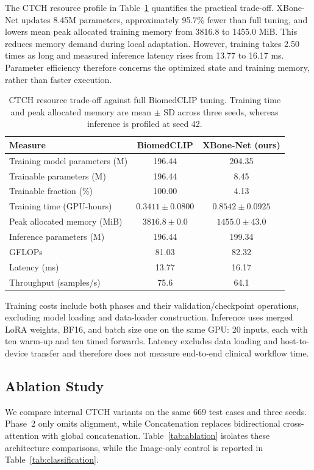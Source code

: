 \documentclass[conference,a4paper]{IEEEtran}
\begin{document}
The CTCH resource profile in Table~\ref{tab:cost} quantifies the practical trade-off. XBone-Net updates 8.45M parameters, approximately 95.7\% fewer than full tuning, and lowers mean peak allocated training memory from 3816.8 to 1455.0 MiB. This reduces memory demand during local adaptation. However, training takes 2.50 times as long and measured inference latency rises from 13.77 to 16.17 ms. Parameter efficiency therefore concerns the optimized state and training memory, rather than faster execution.

\begin{table}[t]
\caption{CTCH resource trade-off against full BiomedCLIP tuning. Training time and peak allocated memory are mean $\pm$ SD across three seeds, whereas inference is profiled at seed 42.}
\label{tab:cost}
\centering\footnotesize
\begin{tabular}{@{}lcc@{}}
\toprule
Measure & BiomedCLIP & \textbf{XBone-Net (ours)} \\
\midrule
Training model parameters (M) & 196.44 & 204.35 \\
Trainable parameters (M) & 196.44 & 8.45 \\
Trainable fraction (\%) & 100.00 & 4.13 \\
Training time (GPU-hours) & $0.3411\pm0.0800$ & $0.8542\pm0.0925$ \\
Peak allocated memory (MiB) & $3816.8\pm0.0$ & $1455.0\pm43.0$ \\
\midrule
Inference parameters (M) & 196.44 & 199.34 \\
GFLOPs & 81.03 & 82.32 \\
Latency (ms) & 13.77 & 16.17 \\
Throughput (samples/s) & 75.6 & 64.1 \\
\bottomrule
\end{tabular}
\end{table}

Training costs include both phases and their validation/checkpoint operations, excluding model loading and data-loader construction. Inference uses merged LoRA weights, BF16, and batch size one on the same GPU: 20 inputs, each with ten warm-up and ten timed forwards. Latency excludes data loading and host-to-device transfer and therefore does not measure end-to-end clinical workflow time.

\subsection{Ablation Study}
We compare internal CTCH variants on the same 669 test cases and three seeds. Phase~2 only omits alignment, while Concatenation replaces bidirectional cross-attention with global concatenation. Table~\ref{tab:ablation} isolates these architecture comparisons, while the Image-only control is reported in Table~\ref{tab:classification}.
\end{document}
